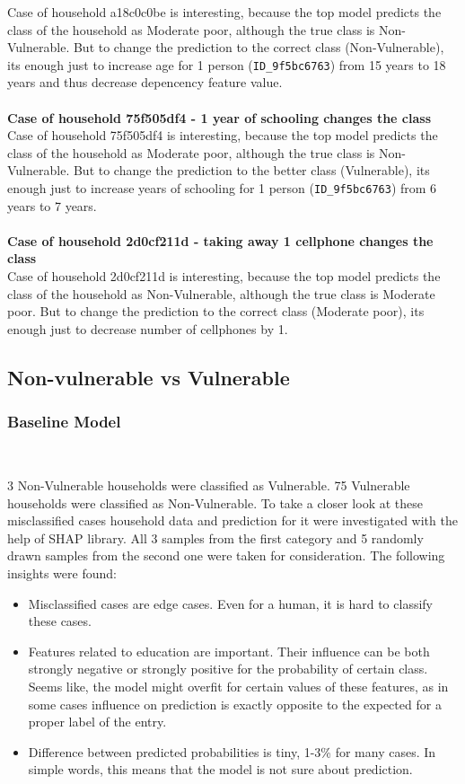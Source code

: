 Case of household a18c0c0be is interesting, because the top model predicts the class of the household as Moderate poor, although the true class is Non-Vulnerable. But to change the prediction to the correct class (Non-Vulnerable), its enough just to increase age for 1 person (\verb|ID_9f5bc6763|) from 15 years to 18 years and thus decrease depencency feature value.\\        
	\\
\textbf{Case of household 75f505df4 - 1 year of schooling changes the class}\\

Case of household 75f505df4 is interesting, because the top model predicts the class of the household as Moderate poor, although the true class is Non-Vulnerable. But to change the prediction to the better class (Vulnerable), its enough just to increase years of schooling for 1 person (\verb|ID_9f5bc6763|) from 6 years to 7 years.\\
\\
\textbf{Case of household 2d0cf211d - taking away 1 cellphone changes the class}\\

Case of household 2d0cf211d is interesting, because the top model predicts the class of the household as Non-Vulnerable, although the true class is Moderate poor. But to change the prediction to the correct class (Moderate poor), its enough just to decrease number of cellphones by 1.\\


    \subsection{Non-vulnerable vs Vulnerable}
    \subsubsection{Baseline Model}~~~
    
    3 Non-Vulnerable households were classified as Vulnerable. 75 Vulnerable households were classified as Non-Vulnerable.
    To take a closer look at these misclassified cases household data and prediction for it were investigated with the help of SHAP library. All 3 samples from the first category and 5 randomly drawn samples from the second one were taken for consideration.
    The following insights were found:
        \begin{itemize}
            \item Misclassified cases are edge cases. Even for a human, it is hard to classify these cases.
            \item Features related to education are important. Their influence can be both strongly negative or strongly positive for the probability of certain class. Seems like, the model might overfit for certain values of these features, as in some cases influence on prediction is exactly opposite to the expected for a proper label of the entry.
            \item Difference between predicted probabilities is tiny, 1-3\% for many cases. In simple words, this means that the model is not sure about prediction.
        \end{itemize}    

